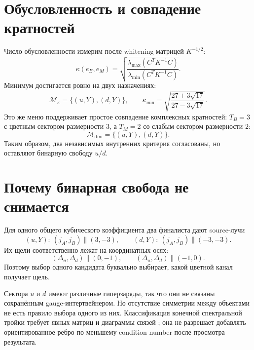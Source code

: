 \section{Обусловленность и совпадение кратностей}

Число обусловленности измерим после whitening матрицей $K^{-1/2}$:
\begin{equation}
 \kappa(e_B,e_M)=
 \sqrt{\frac{\lambda_{\max}(C^TK^{-1}C)}
 {\lambda_{\min}(C^TK^{-1}C)}}.
 \label{eq:v8-cubic-incidence-selector-condition-number}
\end{equation}
Минимум достигается ровно на двух назначениях:
\begin{equation}
 \mathcal M_{\kappa}=\{(u,Y),(d,Y)\},
 \qquad
 \kappa_{\min}=
 \sqrt{\frac{27+3\sqrt{17}}{27-3\sqrt{17}}}.
 \label{eq:v8-cubic-incidence-selector-condition-minima}
\end{equation}
Это же меню поддерживает простое совпадение комплексных кратностей:
$T_B=3$ с цветным сектором размерности $3$, а $T_M=2$ со слабым сектором
размерности $2$:
\begin{equation}
 \mathcal M_{\dim}=\{(u,Y),(d,Y)\}.
 \label{eq:v8-cubic-incidence-selector-dimension-match}
\end{equation}
Таким образом, два независимых внутренних критерия согласованы, но оставляют
бинарную свободу $u/d$.

\section{Почему бинарная свобода не снимается}

Для одного общего кубического коэффициента два финалиста дают source-лучи
\begin{equation}
 (u,Y):\ (j_A,j_B)\parallel(3,-3),
 \qquad
 (d,Y):\ (j_A,j_B)\parallel(-3,-3).
 \label{eq:v8-cubic-incidence-selector-final-rays}
\end{equation}
Их щели соответственно лежат на координатных осях:
\begin{equation}
 (\Delta_u,\Delta_d)\parallel(0,-1),
 \qquad
 (\Delta_u,\Delta_d)\parallel(-1,0).
 \label{eq:v8-cubic-incidence-selector-gap-rays}
\end{equation}
Поэтому выбор одного кандидата буквально выбирает, какой цветной канал
получает щель.

Сектора $u$ и $d$ имеют различные гиперзаряды, так что они не связаны
сохранённым gauge-интертвейнером. Но отсутствие симметрии между объектами не
есть правило выбора одного из них. Классификация конечной спектральной
тройки требует явных матриц и диаграммы связей
\cite{v8-cubic-incidence-selector-krajewski,v8-cubic-incidence-selector-cacic};
она не разрешает добавлять ориентированное ребро по меньшему condition
number после просмотра результата.

